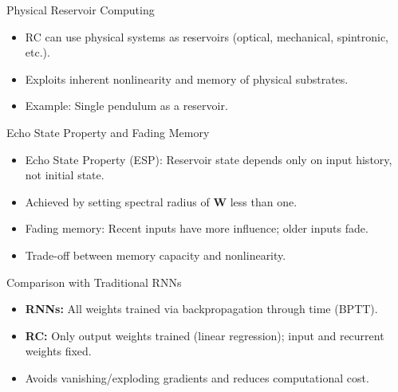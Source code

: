 \documentclass{beamer}
\begin{document}
\begin{frame}{Physical Reservoir Computing}
  \begin{itemize}
    \item RC can use physical systems as reservoirs (optical, mechanical, spintronic, etc.).
    \item Exploits inherent nonlinearity and memory of physical substrates.
    \item Example: Single pendulum as a reservoir.
  \end{itemize}
\end{frame}

\begin{frame}{Echo State Property and Fading Memory}
  \begin{itemize}
    \item Echo State Property (ESP): Reservoir state depends only on input history, not initial state.
    \item Achieved by setting spectral radius of $\mathbf{W}$ less than one.
    \item Fading memory: Recent inputs have more influence; older inputs fade.
    \item Trade-off between memory capacity and nonlinearity.
  \end{itemize}
\end{frame}

\begin{frame}{Comparison with Traditional RNNs}
  \begin{itemize}
    \item \textbf{RNNs:} All weights trained via backpropagation through time (BPTT).
    \item \textbf{RC:} Only output weights trained (linear regression); input and recurrent weights fixed.
    \item Avoids vanishing/exploding gradients and reduces computational cost.
  \end{itemize}
\end{frame}
\end{document}
